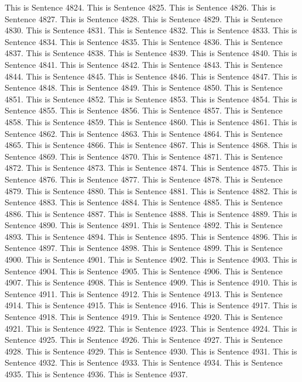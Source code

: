 \documentclass{article}
\begin{document}
This is Sentence 4824.
This is Sentence 4825.
This is Sentence 4826.
This is Sentence 4827.
This is Sentence 4828.
This is Sentence 4829.
This is Sentence 4830.
This is Sentence 4831.
This is Sentence 4832.
This is Sentence 4833.
This is Sentence 4834.
This is Sentence 4835.
This is Sentence 4836.
This is Sentence 4837.
This is Sentence 4838.
This is Sentence 4839.
This is Sentence 4840.
This is Sentence 4841.
This is Sentence 4842.
This is Sentence 4843.
This is Sentence 4844.
This is Sentence 4845.
This is Sentence 4846.
This is Sentence 4847.
This is Sentence 4848.
This is Sentence 4849.
This is Sentence 4850.
This is Sentence 4851.
This is Sentence 4852.
This is Sentence 4853.
This is Sentence 4854.
This is Sentence 4855.
This is Sentence 4856.
This is Sentence 4857.
This is Sentence 4858.
This is Sentence 4859.
This is Sentence 4860.
This is Sentence 4861.
This is Sentence 4862.
This is Sentence 4863.
This is Sentence 4864.
This is Sentence 4865.
This is Sentence 4866.
This is Sentence 4867.
This is Sentence 4868.
This is Sentence 4869.
This is Sentence 4870.
This is Sentence 4871.
This is Sentence 4872.
This is Sentence 4873.
This is Sentence 4874.
This is Sentence 4875.
This is Sentence 4876.
This is Sentence 4877.
This is Sentence 4878.
This is Sentence 4879.
This is Sentence 4880.
This is Sentence 4881.
This is Sentence 4882.
This is Sentence 4883.
This is Sentence 4884.
This is Sentence 4885.
This is Sentence 4886.
This is Sentence 4887.
This is Sentence 4888.
This is Sentence 4889.
This is Sentence 4890.
This is Sentence 4891.
This is Sentence 4892.
This is Sentence 4893.
This is Sentence 4894.
This is Sentence 4895.
This is Sentence 4896.
This is Sentence 4897.
This is Sentence 4898.
This is Sentence 4899.
This is Sentence 4900.
This is Sentence 4901.
This is Sentence 4902.
This is Sentence 4903.
This is Sentence 4904.
This is Sentence 4905.
This is Sentence 4906.
This is Sentence 4907.
This is Sentence 4908.
This is Sentence 4909.
This is Sentence 4910.
This is Sentence 4911.
This is Sentence 4912.
This is Sentence 4913.
This is Sentence 4914.
This is Sentence 4915.
This is Sentence 4916.
This is Sentence 4917.
This is Sentence 4918.
This is Sentence 4919.
This is Sentence 4920.
This is Sentence 4921.
This is Sentence 4922.
This is Sentence 4923.
This is Sentence 4924.
This is Sentence 4925.
This is Sentence 4926.
This is Sentence 4927.
This is Sentence 4928.
This is Sentence 4929.
This is Sentence 4930.
This is Sentence 4931.
This is Sentence 4932.
This is Sentence 4933.
This is Sentence 4934.
This is Sentence 4935.
This is Sentence 4936.
This is Sentence 4937.
\end{document}
